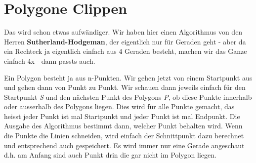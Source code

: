 \section{Polygone Clippen}
Das wird schon etwas aufwändiger. Wir haben hier einen Algorithmus von den Herren \textbf{Sutherland-Hodgeman}, der eigentlich nur für Geraden geht - aber da ein Rechteck ja eigentlich einfach aus 4 Geraden besteht, machen wir das Ganze einfach 4x - dann passts auch.

Ein Polygon besteht ja aus n-Punkten. Wir gehen jetzt von einem Startpunkt aus und gehen dann von Punkt zu Punkt. Wir schauen dann jeweils einfach für den Startpunkt \textit{S} und den nächsten Punkt des Polygons \textit{P}, ob diese Punkte innerhalb oder ausserhalb des Polygons liegen. Dies wird für alle Punkte gemacht, das heisst jeder Punkt ist mal Startpunkt und jeder Punkt ist mal Endpunkt. Die Ausgabe des Algorithmus bestimmt dann, welcher Punkt behalten wird. Wenn die Punkte die Linien schneiden, wird einfach der Schnittpunkt dazu berechnet und entsprechend auch gespeichert. Es wird immer nur eine Gerade angeschaut d.h. am Anfang sind auch Punkt drin die gar nicht im Polygon liegen.
	
